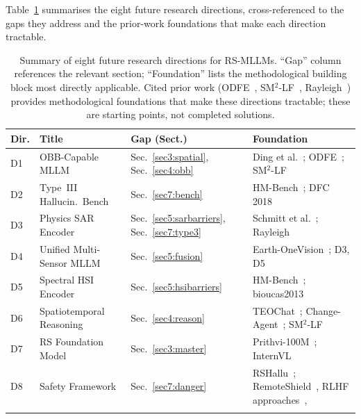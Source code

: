 Table~\ref{tab:future_summary} summarises the eight future research
directions, cross-referenced to the gaps they address and the
prior-work foundations that make each direction tractable.

\begin{table}[h]
\caption{Summary of eight future research directions for RS-MLLMs.
``Gap'' column references the relevant section; ``Foundation'' lists
the methodological building block most directly applicable.
Cited prior work (ODFE~\cite{odfe2025}, SM$^2$-LF~\cite{sm2lf2026}, Rayleigh~\cite{rayleigh2026}) provides methodological
foundations that make these directions tractable; these are starting
points, not completed solutions.}\label{tab:future_summary}
\small\setlength\tabcolsep{4pt}
\begin{tabular*}{\textwidth}{@{\extracolsep\fill}lp{3.0cm}p{3.2cm}p{3.5cm}}
\toprule
\textbf{Dir.} & \textbf{Title} & \textbf{Gap (Sect.)} & \textbf{Foundation} \\
\midrule
D1 & OBB-Capable MLLM
   & Sec.~\ref{sec3:spatial}, Sec.~\ref{sec4:obb}
   & Ding et al.~\cite{ding2021object}; ODFE~\cite{odfe2025}; SM$^2$-LF~\cite{sm2lf2026} \\[3pt]
D2 & Type~III Hallucin.\ Bench
   & Sec.~\ref{sec7:bench}
   & HM-Bench~\cite{hmbench2026}; DFC 2018~\cite{yokoya2018hyperspectral} \\[3pt]
D3 & Physics SAR Encoder
   & Sec.~\ref{sec5:sarbarriers}, Sec.~\ref{sec7:type3}
   & Schmitt et al.~\cite{schmitt2019fusion}; Rayleigh~\cite{rayleigh2026} \\[3pt]
D4 & Unified Multi-Sensor MLLM
   & Sec.~\ref{sec5:fusion}
   & Earth-OneVision~\cite{earthonevision2026}; D3, D5 \\[3pt]
D5 & Spectral HSI Encoder
   & Sec.~\ref{sec5:hsibarriers}
   & HM-Bench~\cite{hmbench2026}; bioucas2013~\cite{bioucas2013hyperspectral} \\[3pt]
D6 & Spatiotemporal Reasoning
   & Sec.~\ref{sec4:reason}
   & TEOChat~\cite{teochat2025}; Change-Agent~\cite{changeagent2025}; SM$^2$-LF~\cite{sm2lf2026} \\[3pt]
D7 & RS Foundation Model
   & Sec.~\ref{sec3:master}
   & Prithvi-100M~\cite{prithvi2023}; InternVL~\cite{internvl2024} \\[3pt]
D8 & Safety Framework
   & Sec.~\ref{sec7:danger}
   & RSHallu~\cite{rshallu2026}; RemoteShield~\cite{remoteshield2026}, RLHF approaches~\cite{rlhfrs2025}, \\
\botrule
\end{tabular*}
\end{table}

